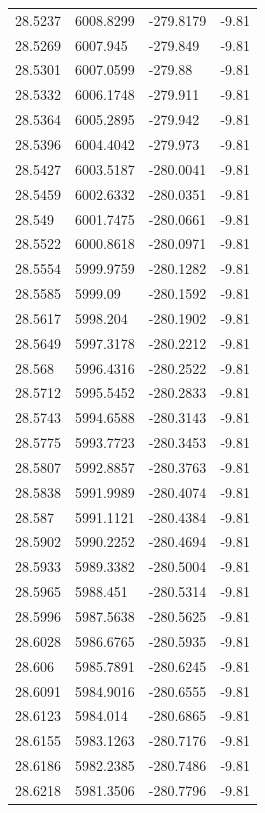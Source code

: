 \begin{table}[H]
\begin{tabular}{llll}
28.5237 & 6008.8299 & -279.8179 & -9.81 \\
28.5269 & 6007.945 & -279.849 & -9.81 \\
28.5301 & 6007.0599 & -279.88 & -9.81 \\
28.5332 & 6006.1748 & -279.911 & -9.81 \\
28.5364 & 6005.2895 & -279.942 & -9.81 \\
28.5396 & 6004.4042 & -279.973 & -9.81 \\
28.5427 & 6003.5187 & -280.0041 & -9.81 \\
28.5459 & 6002.6332 & -280.0351 & -9.81 \\
28.549 & 6001.7475 & -280.0661 & -9.81 \\
28.5522 & 6000.8618 & -280.0971 & -9.81 \\
28.5554 & 5999.9759 & -280.1282 & -9.81 \\
28.5585 & 5999.09 & -280.1592 & -9.81 \\
28.5617 & 5998.204 & -280.1902 & -9.81 \\
28.5649 & 5997.3178 & -280.2212 & -9.81 \\
28.568 & 5996.4316 & -280.2522 & -9.81 \\
28.5712 & 5995.5452 & -280.2833 & -9.81 \\
28.5743 & 5994.6588 & -280.3143 & -9.81 \\
28.5775 & 5993.7723 & -280.3453 & -9.81 \\
28.5807 & 5992.8857 & -280.3763 & -9.81 \\
28.5838 & 5991.9989 & -280.4074 & -9.81 \\
28.587 & 5991.1121 & -280.4384 & -9.81 \\
28.5902 & 5990.2252 & -280.4694 & -9.81 \\
28.5933 & 5989.3382 & -280.5004 & -9.81 \\
28.5965 & 5988.451 & -280.5314 & -9.81 \\
28.5996 & 5987.5638 & -280.5625 & -9.81 \\
28.6028 & 5986.6765 & -280.5935 & -9.81 \\
28.606 & 5985.7891 & -280.6245 & -9.81 \\
28.6091 & 5984.9016 & -280.6555 & -9.81 \\
28.6123 & 5984.014 & -280.6865 & -9.81 \\
28.6155 & 5983.1263 & -280.7176 & -9.81 \\
28.6186 & 5982.2385 & -280.7486 & -9.81 \\
28.6218 & 5981.3506 & -280.7796 & -9.81 \\

\end{tabular}
\end{table}
